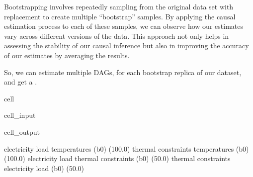 \documentclass[letterpaper,10pt,english]{jupyterBook}
\begin{document}
\sphinxAtStartPar
Bootstrapping involves repeatedly sampling from the original data set with replacement to create multiple “bootstrap” samples. By applying the causal estimation process to each of these samples, we can observe how our estimates vary across different versions of the data. This approach not only helps in assessing the stability of our causal inference but also in improving the accuracy of our estimates by averaging the results.

\sphinxAtStartPar
So, we can estimate multiple DAGs, for each bootstrap replica of our dataset, and get a .

\begin{sphinxuseclass}{cell}\begin{sphinxVerbatimInput}

\begin{sphinxuseclass}{cell_input}
\begin{sphinxVerbatim}[commandchars=\\\{\}]
    

  
   
    
  
\end{sphinxVerbatim}

\end{sphinxuseclass}\end{sphinxVerbatimInput}
\begin{sphinxVerbatimOutput}

\begin{sphinxuseclass}{cell_output}
\begin{sphinxVerbatim}[commandchars=\\\{\}]
electricity load \PYGZlt{}\PYGZhy{}\PYGZhy{}\PYGZhy{} temperatures (b\PYGZgt{}0) (100.0\PYGZpc{})
thermal constraints \PYGZlt{}\PYGZhy{}\PYGZhy{}\PYGZhy{} temperatures (b\PYGZgt{}0) (100.0\PYGZpc{})
electricity load \PYGZlt{}\PYGZhy{}\PYGZhy{}\PYGZhy{} thermal constraints (b\PYGZgt{}0) (50.0\PYGZpc{})
thermal constraints \PYGZlt{}\PYGZhy{}\PYGZhy{}\PYGZhy{} electricity load (b\PYGZgt{}0) (50.0\PYGZpc{})
\end{sphinxVerbatim}

\end{sphinxuseclass}\end{sphinxVerbatimOutput}

\end{sphinxuseclass}
\end{document}
